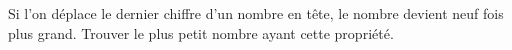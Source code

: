 Si l'on déplace le dernier chiffre d'un nombre en tête, le nombre devient neuf fois plus grand. Trouver le plus petit nombre ayant cette propriété.
